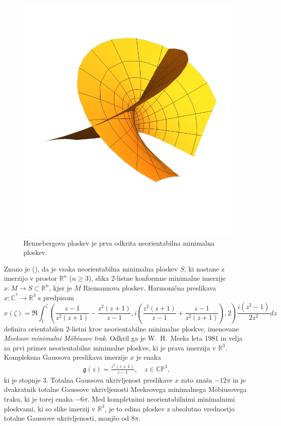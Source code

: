 \documentclass[12pt,a4paper,twoside]{article}
\theoremstyle{definition} %
\theoremstyle{plain} %
\numberwithin{equation}{section}  %
\newcommand{\R}{\mathbb R}
\newcommand{\C}{\mathbb C}
\begin{document}
\begin{figure}[h!]
\begin{center}
\includegraphics[scale=0.8]{images/henneberg.pdf}
\caption{Hennebergova ploskev je prva odkrita neorientabilna minimalna ploskev.}
\end{center}
\end{figure}

Znano je (\cite[Section~2.4]{alarcon2021minimal}), da je vsaka neorientabilna minimalna ploskev $S$, ki nastane z imerzijo v prostor $\R^{n}$ ($n \geq 3$), slika 2-listne konformne minimalne imerzije $x \colon M \to S \subset \R^{n}$, kjer je $M$ Riemannova ploskev.
Harmonična preslikava $x \colon \C^{*} \to \R^{3}$ s predpisom
\begin{equation*}
x(\zeta) = \Re \int_{1}^{\zeta} \left( \frac{z-1}{z^2(z+1)} - \frac{z^2(z+1)}{z-1}, i \left( \frac{z^2(z+1)}{z-1} + \frac{z-1}{z^2(z+1)} \right), 2 \right) \frac{i(z^2-1)}{2z^2} dz
\end{equation*}
definira orientabilen 2-listni krov neorientabilne minimalne ploskve, imenovane \emph{Meeksov minimalni M\"obiusov trak}. Odkril ga je W.~H.~Meeks leta 1981 in velja za prvi primer neorientabilne minimalne ploskve, ki je prava imerzija v $\R^{3}$. \newline
Kompleksna Gaussova preslikava imerzije $x$ je enaka
\begin{gather*}
\mathfrak{g}(z) = \frac{z^2(z+1)}{z-1}, \quad z \in \mathbb{CP}^1,
\end{gather*}
ki je stopnje $3$. Totalna Gaussova ukrivljenost preslikave $x$ zato znaša $-12 \pi$ in je dvakratnik totalne Gaussove ukrivljenosti Meeksovega minimalnega M\"obiusovega traku, ki je torej enaka $-6 \pi$.
Med kompletnimi neorientabilnimi minimalnimi ploskvami, ki so slike imerzij v $\R^3$, je to edina ploskev z absolutno vrednostjo totalne Gaussove ukrivljenosti, manjšo od $8 \pi$.
\end{document}
